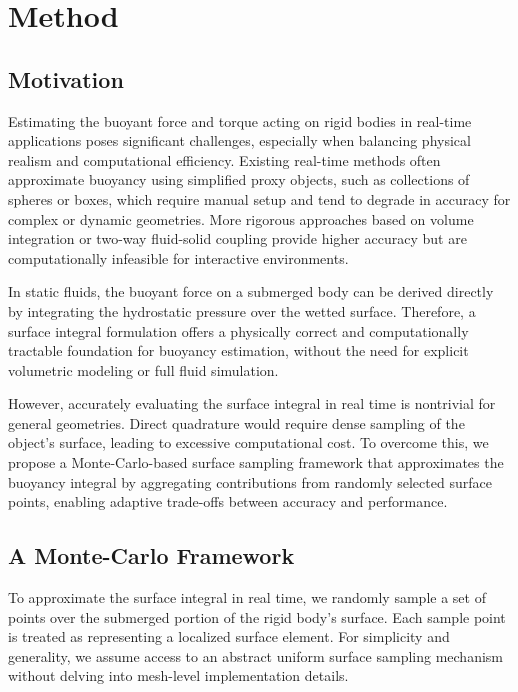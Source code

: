 \section{Method}

\subsection{Motivation}

Estimating the buoyant force and torque acting on rigid bodies in real-time applications poses significant challenges, especially when balancing physical realism and computational efficiency. Existing real-time methods often approximate buoyancy using simplified proxy objects, such as collections of spheres or boxes, which require manual setup and tend to degrade in accuracy for complex or dynamic geometries. More rigorous approaches based on volume integration or two-way fluid-solid coupling provide higher accuracy but are computationally infeasible for interactive environments.

In static fluids, the buoyant force on a submerged body can be derived directly by integrating the hydrostatic pressure over the wetted surface. Therefore, a surface integral formulation offers a physically correct and computationally tractable foundation for buoyancy estimation, without the need for explicit volumetric modeling or full fluid simulation.

However, accurately evaluating the surface integral in real time is nontrivial for general geometries. Direct quadrature would require dense sampling of the object’s surface, leading to excessive computational cost. To overcome this, we propose a Monte-Carlo-based surface sampling framework that approximates the buoyancy integral by aggregating contributions from randomly selected surface points, enabling adaptive trade-offs between accuracy and performance.

\subsection{A Monte-Carlo Framework}

To approximate the surface integral in real time, we randomly sample a set of points over the submerged portion of the rigid body's surface. Each sample point is treated as representing a localized surface element. For simplicity and generality, we assume access to an abstract uniform surface sampling mechanism without delving into mesh-level implementation details.

